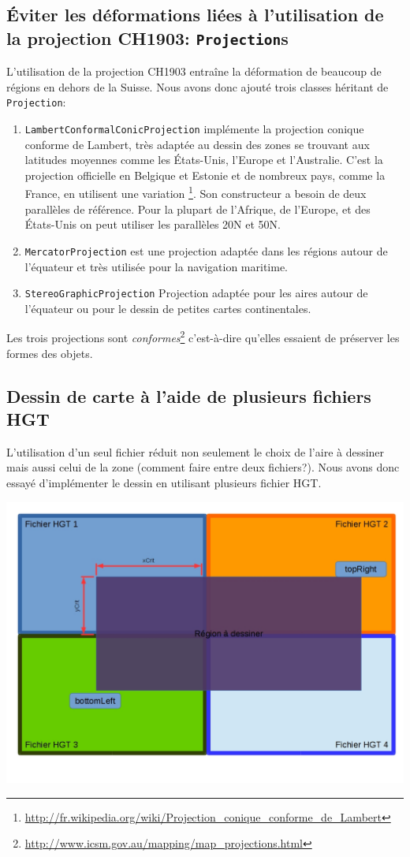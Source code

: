 \documentclass[11pt,a4paper]{article}
\begin{document}
\subsection{Éviter les déformations liées à l'utilisation de la projection CH1903: \texttt{Projection}s}
L'utilisation de la projection CH1903 entraîne la déformation de beaucoup de régions en dehors de la Suisse. Nous avons donc ajouté trois classes héritant de \texttt{Projection}:
\begin{enumerate}
    \item \texttt{LambertConformalConicProjection} implémente la projection conique conforme de Lambert, très adaptée au dessin des zones se trouvant aux latitudes moyennes comme les États-Unis, l'Europe et l'Australie. C'est la projection officielle en Belgique et Estonie et de nombreux pays, comme la France, en utilisent une variation \footnote{\url{http://fr.wikipedia.org/wiki/Projection_conique_conforme_de_Lambert}}. Son constructeur a besoin de deux parallèles de référence. Pour la plupart de l'Afrique, de l'Europe, et des États-Unis on peut utiliser les parallèles 20\degre N et 50\degre N. 
    \item \texttt{MercatorProjection} est une projection adaptée dans les régions autour de l'équateur et très utilisée pour la navigation maritime.
    \item \texttt{StereoGraphicProjection} Projection adaptée pour les aires autour de l'équateur ou pour le dessin de petites cartes continentales.
\end{enumerate}
Les trois projections sont \textit{conformes}\footnote{\url{http://www.icsm.gov.au/mapping/map_projections.html}} c'est-à-dire qu'elles essaient de préserver les formes des objets.

\subsection{Dessin de carte à l'aide de plusieurs fichiers HGT}
L'utilisation d'un seul fichier réduit non seulement le choix de l'aire à dessiner mais aussi celui de la zone (comment faire entre deux fichiers?). Nous avons donc essayé d'implémenter le dessin en utilisant plusieurs fichier HGT.

\begin{center}
\includegraphics[scale=0.3]{schema4files.jpg}
\end{center}
\end{document}
